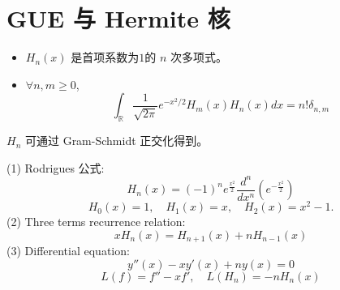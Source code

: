 \section{ GUE 与 Hermite 核}
\begin{definition}
\begin{itemize}
    \item[a)] $H_n(x)$ 是首项系数为$1$的 $n$ 次多项式。
    \item[b)] $\forall n,m \ge 0$,
    \[ \int_{\mathbb{R}} \frac{1}{\sqrt{2\pi}} e^{-x^2/2} H_m(x) H_n(x) dx = n! \delta_{n,m} \]
\end{itemize}
\end{definition}
\begin{remark}
$H_n$ 可通过 Gram-Schmidt 正交化得到。
\end{remark}

\begin{prop}
    (1) Rodrigues 公式:
\[H_n(x)=(-1)^{n}e^{\frac {x^2}{2}}\frac{d^n}{dx^n}(e^{-\frac{x^2}2}) \]
\[H_0(x)=1,\quad H_1(x)=x,\quad H_2(x)=x^2-1.\]
(2) Three terms recurrence relation:
    $$x H_n (x) = H_{n+1} (x) + n H_{n-1} (x)$$
(3) Differential equation:
    $$y''(x) - xy'(x) + ny (x) = 0$$
    \[L(f) = f'' -xf' ,\quad L(H_n) = -n H_n (x)\]
\end{prop}


